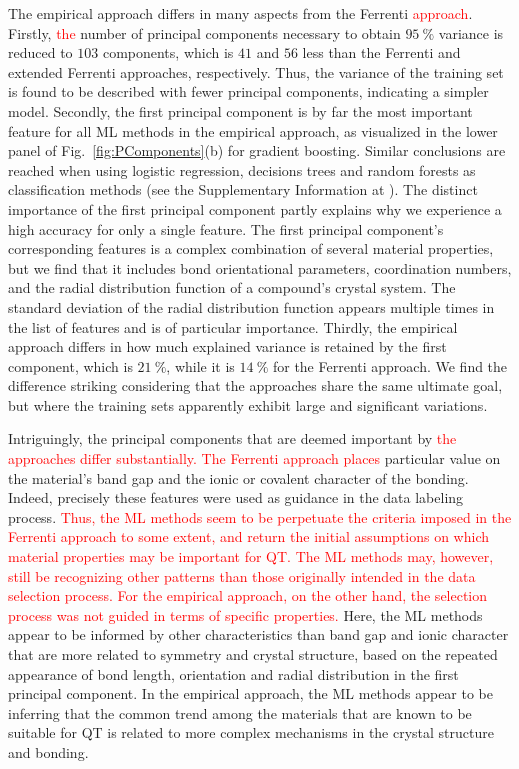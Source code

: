 \documentclass[superscriptaddress,unsortedaddress,
 amsmath,amssymb,
 aps,
]{revtex4-2}
\newcommand{\mrk}[1]{\textcolor{red}{#1}}
\begin{document}
The empirical approach differs in many aspects from the Ferrenti \mrk{approach}. 
Firstly, \mrk{the} number of principal components necessary to obtain $95 \ \%$ variance is reduced to $103$ components, which is $41$ and $56$ less than the Ferrenti and extended Ferrenti approaches, respectively. Thus, the variance of the training set is found to be described with fewer principal components, indicating a simpler model. Secondly, the first principal component is by far the most important feature for all ML methods in the empirical approach, as visualized in the lower panel of Fig.~\ref{fig:PComponents}(b) for gradient boosting. Similar conclusions are reached when using logistic regression, decisions trees and random forests as classification methods (see the Supplementary Information at \cite{supplementary}). 
The distinct importance of the first principal component partly explains why we experience a high accuracy for only a single feature. The first principal component's corresponding features is a complex combination of several material properties, but we find that it includes bond orientational parameters, coordination numbers, and the radial distribution function of a compound's crystal system. 
The standard deviation of the radial distribution function appears multiple times in the list of features and is of particular importance. 
Thirdly, the empirical approach differs in how much explained variance is retained by the first component, which is $21 \ \%$, while it is $14 \ \%$ for the Ferrenti approach. 
We find the difference striking considering that the approaches share the same ultimate goal, but where the training sets apparently exhibit large and significant variations. 

Intriguingly, the principal components that are deemed important by \mrk{the approaches differ substantially. The Ferrenti approach places}  particular value on the material's band gap and the ionic or covalent character of the bonding. Indeed, precisely these features were used as guidance in the data labeling process. \mrk{Thus, the ML methods seem to be perpetuate the criteria imposed in the Ferrenti approach to some extent, and return the initial assumptions on which material properties may be important for QT. The ML methods may, however, still be recognizing other patterns than those originally intended in the data selection process.} \mrk{For the empirical approach, on the other hand, the selection process was not guided in terms of specific properties.} Here, the ML methods appear to be informed by other characteristics than band gap and ionic character that are more related to symmetry and crystal structure, based on the repeated appearance of bond length, orientation and radial distribution in the first principal component. In the empirical approach, the ML methods appear to be inferring that the common trend among the materials that are known to be suitable for QT is related to more complex mechanisms in the crystal structure and bonding. 
\end{document}

